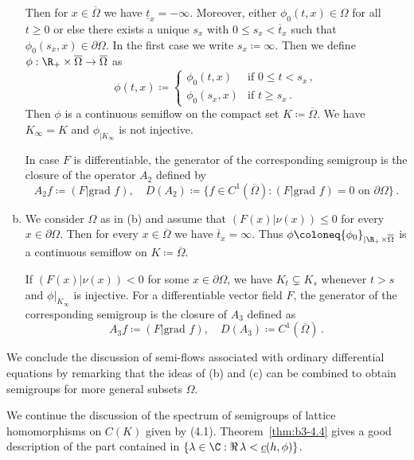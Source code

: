 \begin{example}
\begin{enumerate}[(a), wide]
	Then for $x \in \overline{\Omega}$ we have $\underline{t}_{x} = -\infty$.
	Moreover, either $\phi_{0}(t,x) \in \Omega$ for all $t \geq 0$ or else there exists a unique $s_{x}$ with $0 \leq s_{x} < \overline{t}_{x}$ such that $\phi_{0}(s_{x},x) \in \partial\Omega$.
	In the first case we write $s_{x} \coloneq \infty$.
	Then we define $\phi: \R_{+} \times \overline{\Omega} \to \overline{\Omega}$ as 
	\[\phi(t,x) \coloneq \begin{cases}
		\phi_{0}(t,x) & \text{if } 0 \leq t < s_{x} \,, \\
		\phi_{0}(s_{x},x) & \text{if } t \geq s_{x} \,.
	\end{cases}\]
	Then $\phi$ is a continuous semiflow on the compact set $K \coloneq \overline{\Omega}$.
	We have $K_{\infty} = K$ and $\phi_{|K_{\infty}}$ is not injective.
	
	In case $F$ is differentiable, the generator of the corresponding semigroup is the closure of the operator $A_{2}$ defined by
	\[
	A_{2}f \coloneq (F|\text{grad }f), \quad D(A_{2}) \coloneq \{f \in C^1(\overline{\Omega}) : (F|\text{grad }f) = 0 \text{ on } \partial\Omega\}\,.	
	\]
	
	\item 
	We consider $\Omega$ as in (b) and assume that $(F(x)|\nu(x)) \leq 0$ for every $x \in \partial\Omega$.
	Then for every $x \in \overline{\Omega}$ we have $\overline{t}_{x} = \infty$.
	Thus $\phi \coloneq {\phi_{0}}_{|\R_{+}\times\overline{\Omega}}$ is a continuous semiflow on $K \coloneq \overline{\Omega}$.
	
	If $(F(x)|\nu(x)) < 0$ for some $x \in \partial\Omega$, we have $K_{t} \subsetneq K_{s}$ whenever $t > s$ and $\phi|_{K_{\infty}}$ is injective.
	For a differentiable vector field $F$, the generator of the corresponding semigroup is the closure of $A_{3}$ defined as
	\[
	A_{3}f \coloneq (F|\text{grad }f), \quad D(A_{3}) \coloneq C^1(\overline{\Omega})\,.
	\]
\end{enumerate}
\end{example}

We conclude the discussion of semi-flows associated with ordinary differential equations by remarking that the ideas of (b) and (c) can be combined to obtain semigroups for more general subsets $\Omega$.

We continue the discussion of the spectrum of semigroups of lattice homomorphisms on $C(K)$ given by (4.1).
Theorem~\ref{thm:b3-4.4} gives a good description of the part contained in $\{\lambda \in \C : \Re\,\lambda  < \underline{c}(h,\phi)\}$.

